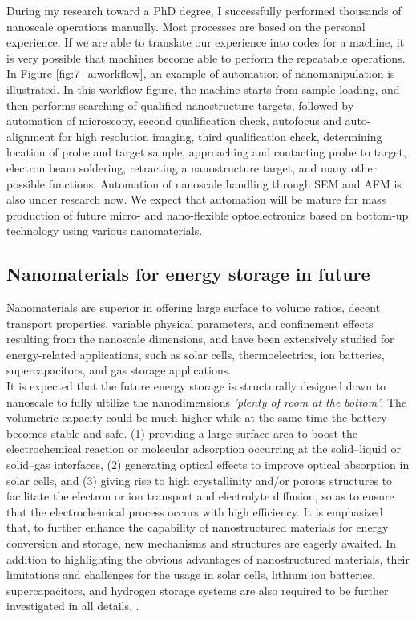 During my research toward a PhD degree, I successfully performed thousands of nanoscale operations manually. Most processes are based on the personal experience.  
If we are able to translate our experience into codes for a machine, it is very possible that machines become able to perform the repeatable operations. In Figure \ref{fig:7_aiworkflow}, an example of automation of nanomanipulation is illustrated. In this workflow figure, the machine starts from sample loading, and then performs searching of qualified nanostructure targets, followed by automation of microscopy, second qualification check, autofocus and auto-alignment for high resolution imaging, third qualification check, determining location of probe and target sample, approaching and contacting probe to target, electron beam soldering, retracting a nanostructure target, and many other possible functions. 
Automation of nanoscale handling through SEM and AFM is also under research now. \cite{Fatikow1997Microsystem} We expect that automation will be mature for mass production of future micro- and nano-flexible optoelectronics based on bottom-up technology using various nanomaterials. 

\subsection{Nanomaterials for energy storage in future}
Nanomaterials are superior in offering large surface to volume ratios, decent transport properties, variable physical parameters, and confinement effects resulting from the nanoscale dimensions, and have been extensively studied for energy-related applications, such as solar cells, thermoelectrics, ion batteries, supercapacitors, and gas storage applications.\\
It is expected that the future energy storage is structurally designed down to nanoscale to fully ultilize the nanodimensions {\it 'plenty of room at the bottom'}. The volumetric capacity could be much higher while at the same time the battery becomes stable and safe. 
(1) providing a large surface area to boost the electrochemical reaction or molecular adsorption occurring at the solid–liquid or solid–gas interfaces, 
(2) generating optical effects to improve optical absorption in solar cells, and 
(3) giving rise to high crystallinity and/or porous structures to facilitate the electron or ion transport and electrolyte diffusion, so as to ensure that the electrochemical process occurs with high efficiency. It is emphasized that, to further enhance the capability of nanostructured materials for energy conversion and storage, new mechanisms and structures are eagerly awaited. 
In addition to highlighting the obvious advantages of nanostructured materials, their limitations and challenges for the usage in solar cells, lithium ion batteries, supercapacitors, and hydrogen storage systems are also required to be further investigated in all details. .\cite{qifengzhang2013csr}\\



